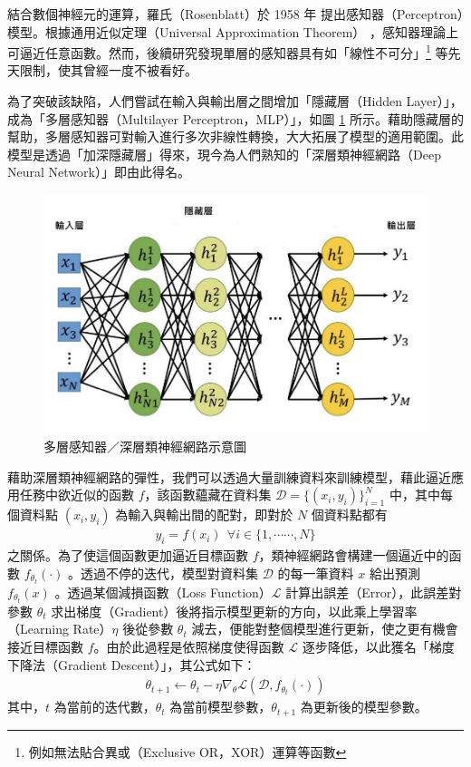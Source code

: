         結合數個神經元的運算，羅氏（Rosenblatt）於 1958 年 \cite{rosenblatt_perceptron_1958} 提出感知器（Perceptron）模型。根據通用近似定理（Universal Approximation Theorem）\cite{funahashi_approximate_1989} ，感知器理論上可逼近任意函數。然而，後續研究發現單層的感知器具有如「線性不可分」\footnote{例如無法貼合異或（Exclusive OR，XOR）運算等函數} 等先天限制，使其曾經一度不被看好。

        為了突破該缺陷，人們嘗試在輸入與輸出層之間增加「隱藏層（Hidden Layer）」，成為「多層感知器（Multilayer Perceptron，MLP）」，如圖 \ref{fig:mlp} 所示。藉助隱藏層的幫助，多層感知器可對輸入進行多次非線性轉換，大大拓展了模型的適用範圍。此模型是透過「加深隱藏層」得來，現今為人們熟知的「深層類神經網路（Deep Neural Network）」即由此得名。

\begin{figure}
    \centering
    \includegraphics[width=0.8\linewidth]{figures/nnout.png}
    \caption{多層感知器／深層類神經網路示意圖}
    \label{fig:mlp}
\end{figure}

        藉助深層類神經網路的彈性，我們可以透過大量訓練資料來訓練模型，藉此逼近應用任務中欲近似的函數 $f$，該函數蘊藏在資料集 $\mathcal{D} = \{(x_i, y_i)\}_{i=1}^N$ 中，其中每個資料點 $(x_i, y_i)$ 為輸入與輸出間的配對，即對於 $N$ 個資料點都有 
\begin{align}
    y_i = f(x_i) \ \  \forall i \in \{1, \cdots\cdots, N\}
\end{align}
之關係。為了使這個函數更加逼近目標函數 $f$，類神經網路會構建一個逼近中的函數 $f_{\theta_t}(\cdot)$ 。透過不停的迭代，模型對資料集 $\mathcal{D}$ 的每一筆資料 $x$ 給出預測 $f_{\theta_t}(x)$ 。透過某個減損函數（Loss Function）$\mathcal{L}$ 計算出誤差（Error），此誤差對參數 $\theta_t$ 求出梯度（Gradient）後將指示模型更新的方向，以此乘上學習率（Learning Rate）$\eta$ 後從參數  $\theta_t$ 減去，便能對整個模型進行更新，使之更有機會接近目標函數 $f$。由於此過程是依照梯度使得函數 $\mathcal{L}$ 逐步降低，以此獲名「梯度下降法（Gradient Descent）」，其公式如下：
\begin{align}
    \theta_{t+1} \leftarrow \theta_{t} - \eta \nabla_\theta\mathcal{L}(\mathcal{D}, f_{\theta_t}(\cdot))
\end{align}
其中，$t$ 為當前的迭代數，$\theta_t$ 為當前模型參數，$\theta_{t+1}$ 為更新後的模型參數。

